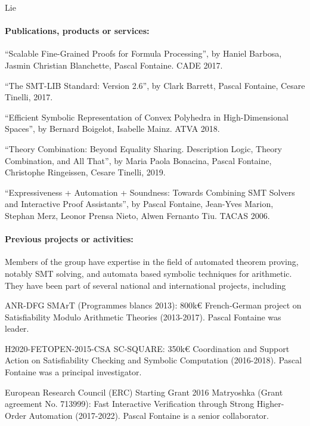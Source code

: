 \begin{sitedescription}{Lie}
\paragraph*{Publications, products or services:}

\begin{compactitem}
\item ``Scalable Fine-Grained Proofs for Formula Processing'', by Haniel Barbosa, Jasmin Christian Blanchette, Pascal Fontaine. CADE 2017.

\item ``The SMT-LIB Standard: Version 2.6'', by Clark Barrett, Pascal Fontaine, Cesare Tinelli, 2017.

\item ``Efficient Symbolic Representation of Convex Polyhedra in High-Dimensional Spaces'', by Bernard Boigelot, Isabelle Mainz. ATVA 2018.

\item ``Theory Combination: Beyond Equality Sharing. Description Logic, Theory Combination, and All That'', by Maria Paola Bonacina, Pascal Fontaine, Christophe Ringeissen, Cesare Tinelli, 2019.

\item ``Expressiveness + Automation + Soundness: Towards Combining SMT Solvers and Interactive Proof Assistants'', by Pascal Fontaine, Jean-Yves Marion, Stephan Merz, Leonor Prensa Nieto, Alwen Fernanto Tiu. TACAS 2006.
\end{compactitem}

\paragraph*{Previous projects or activities:}

Members of the group have expertise in the field of automated theorem proving, notably SMT solving, and automata based symbolic techniques for arithmetic.  They have been part of several national and international projects, including
\begin{compactitem}
\item ANR-DFG SMArT (Programmes blancs 2013): 800k€ French-German project on Satisfiability Modulo Arithmetic Theories (2013-2017).  Pascal Fontaine was leader.
\item H2020-FETOPEN-2015-CSA SC-SQUARE: 350k€ Coordination and Support Action on Satisfiability Checking and Symbolic Computation (2016-2018).  Pascal Fontaine was a principal investigator.
\item European Research Council (ERC) Starting Grant 2016 Matryoshka (Grant
  agreement No. 713999): Fast Interactive Verification through Strong
  Higher-Order Automation (2017-2022).  Pascal Fontaine is a senior
  collaborator.
\end{compactitem}


\end{sitedescription}
